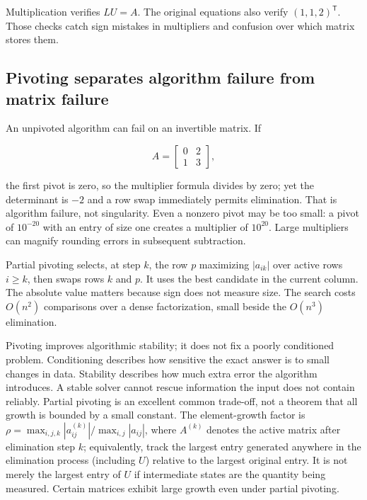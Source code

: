 Multiplication verifies \(LU=A\). The original equations also verify \((1,1,2)^\mathsf T\). Those checks catch sign mistakes in multipliers and confusion over which matrix stores them.

\subsection{Pivoting separates algorithm failure from matrix failure}\label{01-foundations-i-ch019-pivoting-separates-algorithm-failure-from-matrix-failure}

\hypertarget{01-foundations-i-ch019-pivoting-separates-algorithm-failure-from-matrix-failure}{}

An unpivoted algorithm can fail on an invertible matrix. If

\[
A=\begin{bmatrix}0&2\\1&3\end{bmatrix},
\]

the first pivot is zero, so the multiplier formula divides by zero; yet the determinant is \(-2\) and a row swap immediately permits elimination. That is algorithm failure, not singularity. Even a nonzero pivot may be too small: a pivot of \(10^{-20}\) with an entry of size one creates a multiplier of \(10^{20}\). Large multipliers can magnify rounding errors in subsequent subtraction.

Partial pivoting selects, at step \(k\), the row \(p\) maximizing \(|a_{ik}|\) over active rows \(i\ge k\), then swaps rows \(k\) and \(p\). It uses the best candidate in the current column. The absolute value matters because sign does not measure size. The search costs \(O(n^2)\) comparisons over a dense factorization, small beside the \(O(n^3)\) elimination.

Pivoting improves algorithmic stability; it does not fix a poorly conditioned problem. Conditioning describes how sensitive the exact answer is to small changes in data. Stability describes how much extra error the algorithm introduces. A stable solver cannot rescue information the input does not contain reliably. Partial pivoting is an excellent common trade-off, not a theorem that all growth is bounded by a small constant. The element-growth factor is \(\rho=\max_{i,j,k}|a_{ij}^{(k)}|/\max_{i,j}|a_{ij}|\), where \(A^{(k)}\) denotes the active matrix after elimination step \(k\); equivalently, track the largest entry generated anywhere in the elimination process (including \(U\)) relative to the largest original entry. It is not merely the largest entry of \(U\) if intermediate states are the quantity being measured. Certain matrices exhibit large growth even under partial pivoting.

